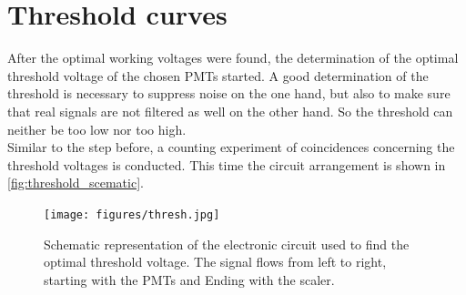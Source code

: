 \section{Threshold curves}
After the optimal working voltages were found, the determination of the optimal threshold voltage of the chosen PMTs started.
A good determination of the threshold is necessary to suppress noise on the one hand, but also to make sure that real signals are not
filtered as well on the other hand. So the threshold can neither be too low nor too high.\\

Similar to the step before, a counting experiment of coincidences concerning the threshold voltages is conducted. This time the circuit arrangement is shown in 
\autoref{fig:threshold_scematic}.
\begin{figure}
   \centering
   \texttt{[image: figures/thresh.jpg]}
   \caption{Schematic representation of the electronic circuit used to find the optimal threshold voltage.
   The signal flows from left to right, starting with the PMTs and Ending with the scaler.}
   \label{fig:threshold_scematic}
\end{figure}

